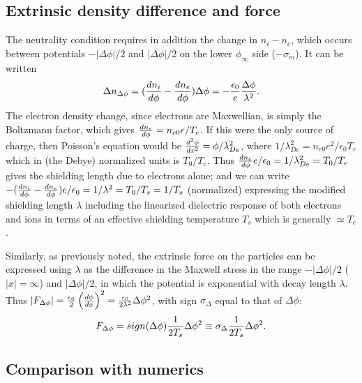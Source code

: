\documentclass[pre]{revtex4-2}
\begin{document}
\subsection{Extrinsic density difference and force}

The neutrality condition requires in addition the change in $n_i-n_e$,
which occurs between potentials $-|\Delta\phi|/2$ and $|\Delta\phi|/2$
on the lower $\phi_\infty$ side ($-\sigma_m$). It can be written
\begin{equation}
  \label{eq:Dpext}
  \Delta n_{\Delta\phi}= ({dn_i\over d\phi} - {dn_e\over
    d\phi})\Delta\phi
  =-{\epsilon_0\over e}{\Delta \phi\over\lambda^2}.
\end{equation}
The electron density change, since electrons are Maxwellian, is simply
the Boltzmann factor, which gives ${dn_e\over d\phi}=n_{e0}e/T_e$. If
this were the only source of charge, then Poisson's equation would be
${d^2\phi\over dx^2}=\phi/\lambda_{De}^2$, where
$1/\lambda_{De}^2=n_{e0}e^2/\epsilon_0T_e$ which in (the Debye)
normalized units is $T_0/T_e$.  Thus
${dn_e\over d\phi}e/\epsilon_0=1/\lambda_{De}^2=T_0/T_e$ gives the
shielding length due to electrons alone; and we can write
$-({dn_i\over d\phi} - {dn_e\over
  d\phi})e/\epsilon_0=1/\lambda^2=T_0/T_s=1/T_s$ (normalized)
expressing the modified shielding length $\lambda$ including the
linearized dielectric response of both electrons and ions in terms of
an effective shielding temperature $T_s$ which is generally
$\simeq T_e$.



Similarly, as previously noted, the extrinsic force on the particles
can be expressed using $\lambda$ as the difference in the Maxwell
stress in the range $-|\Delta\phi|/2$ ($|x|=\infty$) and
$|\Delta\phi|/2$, in which the potential is exponential with decay
length $\lambda$. Thus
$|F_{\Delta\phi}|= {\epsilon_0\over2}\left(d\phi\over dx\right)^2=
{\epsilon_0\over 2\lambda^2}\Delta\phi^2$, with sign $\sigma_\Delta$
equal to that of $\Delta\phi$:
\begin{equation}
  \label{eq:forceco}
F_{\Delta\phi}=sign(\Delta\phi){1\over 2T_s}\Delta\phi^2\equiv\sigma_\Delta{1\over 2T_s}\Delta\phi^2.  
\end{equation}

\subsection{Comparison with numerics}
\end{document}
